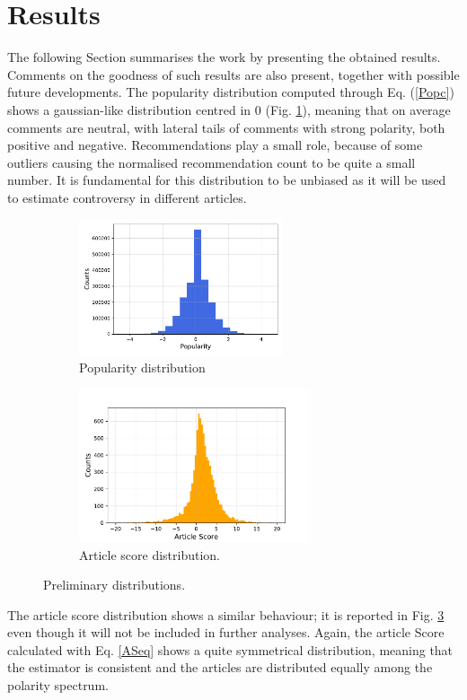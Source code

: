 \section{Results}
\label{Resul}

The following Section summarises the work by presenting the obtained results. Comments on the goodness of such results are also present, together with possible future developments. 
The popularity distribution computed through Eq. (\ref{Popc}) shows a gaussian-like distribution centred in 0 (Fig. \ref{PopDist}), meaning that on average comments are neutral, with lateral tails of comments with strong polarity, both positive and negative. Recommendations play a small role, because of some outliers causing the normalised recommendation count to be quite a small number. It is fundamental for this distribution to be unbiased as it will be used to estimate controversy in different articles. 

\begin{figure}
\centering
    \begin{subfigure}{0.5\tw}
    \centering
    \includegraphics[height=4cm]{Pictures/PopularityDist.pdf}
    \caption{Popularity distribution}
    \label{PopDist}
    \end{subfigure}%
\hfill
    \begin{subfigure}{0.5\tw}
    \centering
    \includegraphics[height=4.5cm]{Pictures/articleScoreDist.pdf}
    \caption{Article score distribution.}
    \label{AScore}
    \end{subfigure}
\caption{Preliminary distributions.}
\end{figure}

The article score distribution shows a similar behaviour; it is reported in Fig. \ref{AScore} even though it will not be included in further analyses. Again, the article Score calculated with Eq. \ref{ASeq} shows a quite symmetrical distribution, meaning that the estimator is consistent and the articles are distributed equally among the polarity spectrum.

